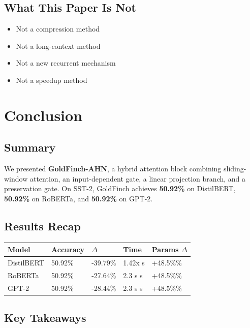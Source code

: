 \subsection{What This Paper Is Not}

\begin{itemize}
\item Not a compression method
\item Not a long-context method
\item Not a new recurrent mechanism
\item Not a speedup method

\end{itemize}



\section{Conclusion}

\subsection{Summary}

We presented \textbf{GoldFinch-AHN}, a hybrid attention block combining 
sliding-window attention, an input-dependent gate, a linear projection 
branch, and a preservation gate. On SST-2, GoldFinch achieves 
\textbf{50.92\%} on DistilBERT, \textbf{50.92\%} on RoBERTa, and 
\textbf{50.92\%} on GPT-2.

\subsection{Results Recap}

\begin{table}[H]
\centering
\small
\begin{tabular}{lllll}
\toprule
\textbf{Model} & \textbf{Accuracy} & \textbf{$\Delta$} & \textbf{Time} & \textbf{Params $\Delta$} \\
\midrule
DistilBERT & 50.92\% & -39.79\% & 1.42x s & +48.5\%\% \\
RoBERTa & 50.92\% & -27.64\% & 2.3 s s & +48.5\%\% \\
GPT-2 & 50.92\% & -28.44\% & 2.3 s s & +48.5\%\% \\
\bottomrule
\end{tabular}
\end{table}

\subsection{Key Takeaways}

